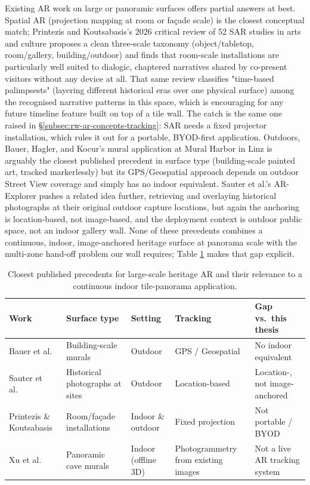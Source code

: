 Existing AR work on large or panoramic surfaces offers partial answers
at best. Spatial AR (projection mapping at room or façade scale)
is the closest conceptual match; Printezis and Koutsabasis's 2026
critical review of 52 SAR studies in arts and culture \cite{printezis2026}
proposes a clean three-scale taxonomy (object/tabletop, room/gallery,
building/outdoor) and finds that room-scale installations are
particularly well suited to dialogic, chaptered narratives shared by
co-present visitors without any device at all. That same review
classifies "time-based palimpsests" (layering different historical eras over one physical surface) among the recognised narrative
patterns in this space, which is encouraging for any future timeline
feature built on top of a tile wall. The catch is the same one raised in
\S\ref{subsec:rw-ar-concepts-tracking}: SAR needs a fixed projector
installation, which rules it out for a portable, BYOD-first application.
Outdoors, Bauer, Hagler, and Kocur's mural application at Mural Harbor in
Linz \cite{bauer2025} is arguably the closest published precedent in
surface type (building-scale painted art, tracked markerlessly) but
its GPS/Geospatial approach depends on outdoor Street View coverage and
simply has no indoor equivalent. Sauter et al.'s AR-Explorer
\cite{sauter2024} pushes a related idea further, retrieving and
overlaying historical photographs at their original outdoor capture
locations, but again the anchoring is location-based, not
image-based, and the deployment context is outdoor public space, not
an indoor gallery wall. None of these precedents combines a
continuous, indoor, image-anchored heritage surface at panorama scale
with the multi-zone hand-off problem our wall requires; Table
\ref{tab:large-scale-precedents} makes that gap explicit.
 
\begin{table}[h]
\centering
\caption{Closest published precedents for large-scale heritage AR and
their relevance to a continuous indoor tile-panorama application.}
\label{tab:large-scale-precedents}
\small
\begin{tabular}{p{2.3cm}p{2.6cm}p{2cm}p{2.6cm}p{3.2cm}}
\toprule
\textbf{Work} & \textbf{Surface type} & \textbf{Setting} & \textbf{Tracking} & \textbf{Gap vs.\ this thesis} \\
\midrule
Bauer et al.\ \cite{bauer2025} & Building-scale murals & Outdoor & GPS / Geospatial & No indoor equivalent \\
Sauter et al.\ \cite{sauter2024} & Historical photographs at sites & Outdoor & Location-based & Location-, not image-anchored \\
Printezis \& Koutsabasis \cite{printezis2026} & Room/façade installations & Indoor \& outdoor & Fixed projection & Not portable / BYOD \\
Xu et al.\ \cite{xu2026panoramic} & Panoramic cave murals & Indoor (offline 3D) & Photogrammetry from existing images & Not a live AR tracking system \\
\bottomrule
\end{tabular}
\end{table}
 
